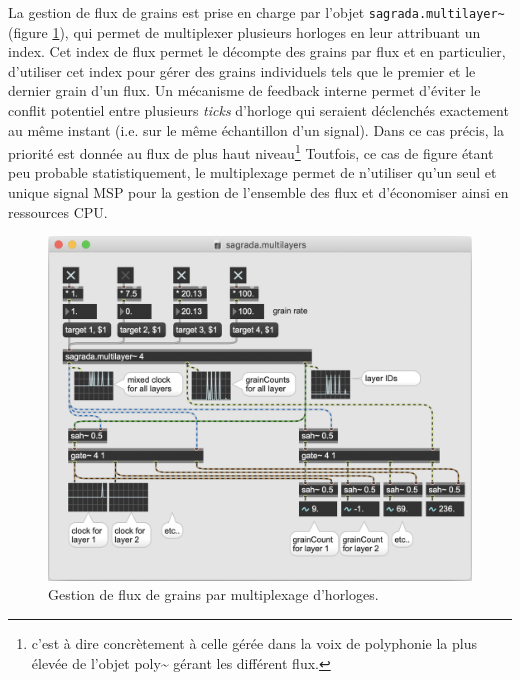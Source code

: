 \noindent La gestion de flux de grains est prise en charge par l'objet \verb|sagrada.multilayer~| (figure \ref{fig:algorithms:MP-multilayers}), qui permet de multiplexer plusieurs horloges en leur attribuant un index. Cet index de flux permet le décompte des grains par flux et en particulier, d'utiliser cet index pour gérer des grains individuels tels que le premier et le dernier grain d'un flux. 
\indent Un mécanisme de feedback interne permet d'éviter le conflit potentiel entre plusieurs \textit{ticks} d'horloge qui seraient déclenchés exactement au même instant (i.e. sur le même échantillon d'un signal). Dans ce cas précis, la priorité est donnée au flux de plus haut niveau\footnote{c'est à dire concrètement à celle gérée dans la voix de polyphonie la plus élevée de l'objet poly\textasciitilde{} gérant les différent flux.} Toutfois, ce cas de figure étant peu probable statistiquement, le multiplexage permet de n'utiliser qu'un seul et unique signal \gls{MSP} pour la gestion de l'ensemble des flux et d'économiser ainsi en ressources \gls{CPU}.

\begin{figure}[!htbp]
	\captionsetup{format=plain}
	\includegraphics[width=\textwidth]{gfx/04_algorithms/Sagrada-multilayers.png}
	\caption[Sagrada : gestion de flux de grains]{Gestion de flux de grains par multiplexage d'horloges.}
	\label{fig:algorithms:MP-multilayers}
\end{figure}

